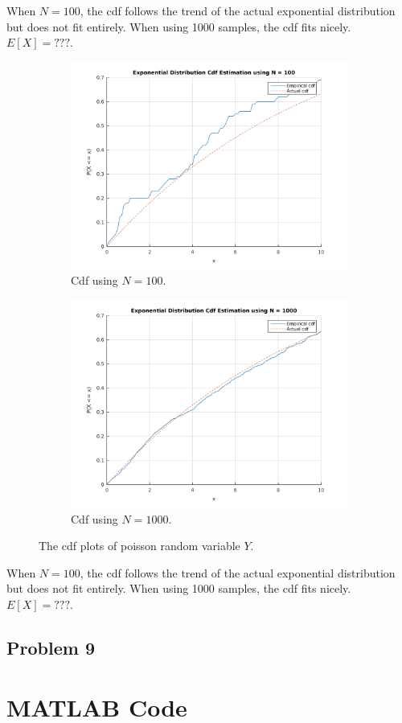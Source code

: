 \documentclass{article}
\begin{document}
		When $N = 100$, the cdf follows the trend of the actual exponential
		distribution but does not fit entirely. When using 1000 samples, the cdf
		fits nicely. $E[X] = ???$.
		\begin{figure}[!hbt]
			\centering
			\begin{subfigure}[!hbt]{0.45\linewidth}
				\centering
				\includegraphics[width=1\linewidth]{hw2_8_exp_n100.png}
				\caption{Cdf using $N = 100$.}
			\end{subfigure}
			\begin{subfigure}[!hbt]{0.45\linewidth}
				\centering
				\includegraphics[width=1\linewidth]{hw2_8_exp_n1000.png}
				\caption{Cdf using $N = 1000$.}
			\end{subfigure}
			\caption{The cdf plots of poisson random variable $Y$.}
		\end{figure}
		When $N = 100$, the cdf follows the trend of the actual exponential
		distribution but does not fit entirely. When using 1000 samples, the cdf
		fits nicely. $E[X] = ???$.
	\subsection*{Problem 9}

\section*{MATLAB Code}
		\inputminted[tabsize=2,breaklines]{matlab}{hw2.m}
\end{document}

